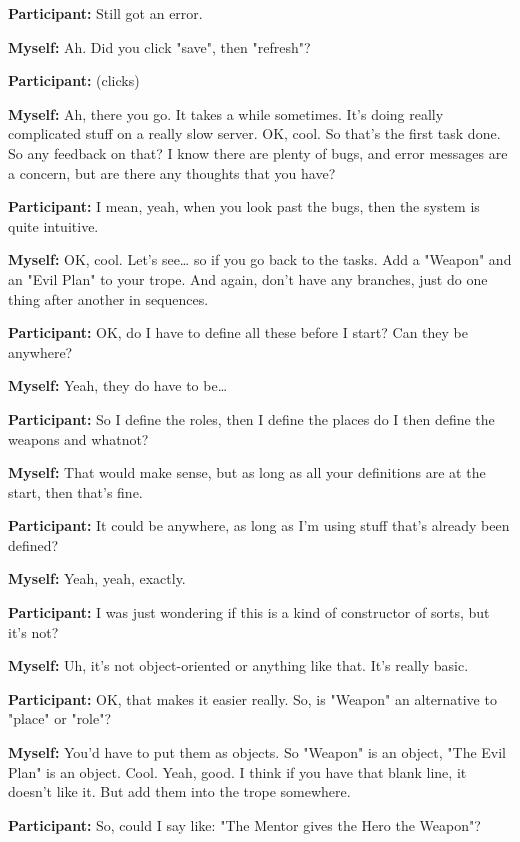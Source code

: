\documentclass[11pt]{report}
\begin{document}
\begin{linenumbers}
\textbf{Participant:} Still got an error.

\textbf{Myself:} Ah. Did you click "save", then "refresh"?

\textbf{Participant:} (clicks)

\textbf{Myself:} Ah, there you go. It takes a while sometimes. It's doing really complicated stuff on a really slow server. OK, cool. So that's the first task done. So any feedback on that? I know there are plenty of bugs, and error messages are a concern, but are there any thoughts that you have?

\textbf{Participant:} I mean, yeah, when you look past the bugs, then the system
is quite intuitive.

\textbf{Myself:} OK, cool. Let's see\ldots{} so if you go back to the tasks. Add a "Weapon" and an "Evil Plan" to your trope. And again, don't have any branches, just do one thing after another in sequences.

\textbf{Participant:} OK, do I have to define all these before I start? Can they
be anywhere?

\textbf{Myself:} Yeah, they do have to be\ldots{}

\textbf{Participant:} So I define the roles, then I define the places do I then define the weapons and whatnot?

\textbf{Myself:} That would make sense, but as long as all your definitions are at the start, then that's fine.

\textbf{Participant:} It could be anywhere, as long as I'm using stuff that's already been defined?

\textbf{Myself:} Yeah, yeah, exactly.

\textbf{Participant:} I was just wondering if this is a kind of constructor of sorts, but it's not?

\textbf{Myself:} Uh, it's not object-oriented or anything like that. It's really basic.

\textbf{Participant:} OK, that makes it easier really. So, is "Weapon" an alternative to "place" or "role"?

\textbf{Myself:} You'd have to put them as objects. So "Weapon" is an object, "The Evil Plan" is an object. Cool. Yeah, good. I think if you have that blank line, it doesn't like it. But add them into the trope somewhere.

\textbf{Participant:} So, could I say like: "The Mentor gives the Hero the
Weapon"?


\end{linenumbers}
\end{document}
